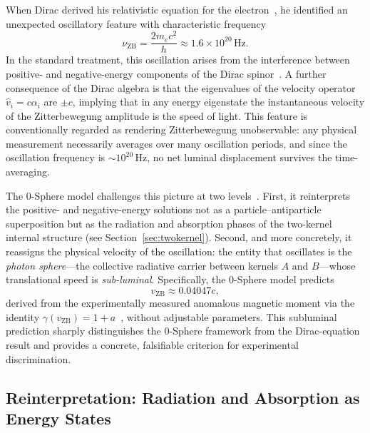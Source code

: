 \documentclass[12pt,letterpaper]{article}
\begin{document}
When Dirac derived his relativistic equation for the electron~\cite{Dirac1928}, he identified an unexpected oscillatory feature with characteristic frequency
\begin{equation}
\nu_{\mathrm{ZB}} = \frac{2 m_e c^2}{h} \approx 1.6 \times 10^{20} \, \mathrm{Hz}.
\end{equation}
In the standard treatment, this oscillation arises from the interference between positive- and negative-energy components of the Dirac spinor~\cite{Schrodinger1930}. A further consequence of the Dirac algebra is that the eigenvalues of the velocity operator $\hat{v}_i = c\alpha_i$ are $\pm c$, implying that in any energy eigenstate the instantaneous velocity of the Zitterbewegung amplitude is the speed of light. This feature is conventionally regarded as rendering Zitterbewegung unobservable: any physical measurement necessarily averages over many oscillation periods, and since the oscillation frequency is $\sim 10^{20}\,\mathrm{Hz}$, no net luminal displacement survives the time-averaging.

The 0-Sphere model challenges this picture at two levels~\cite{hanamura17760132}. First, it reinterprets the positive- and negative-energy solutions not as a particle--antiparticle superposition but as the radiation and absorption phases of the two-kernel internal structure (see Section~\ref{sec:twokernel}). Second, and more concretely, it reassigns the physical velocity of the oscillation: the entity that oscillates is the \emph{photon sphere}---the collective radiative carrier between kernels $A$ and $B$---whose translational speed is \emph{sub-luminal}. Specifically, the 0-Sphere model predicts~\cite{hanamura18356895}
\begin{equation}
v_{\mathrm{ZB}} \approx 0.04047c,
\end{equation}
derived from the experimentally measured anomalous magnetic moment via the identity $\gamma(v_{\mathrm{ZB}}) = 1 + a$~\cite{hanamura17765409}, without adjustable parameters. This subluminal prediction sharply distinguishes the 0-Sphere framework from the Dirac-equation result and provides a concrete, falsifiable criterion for experimental discrimination.

\subsection{Reinterpretation: Radiation and Absorption as Energy States}
\end{document}
